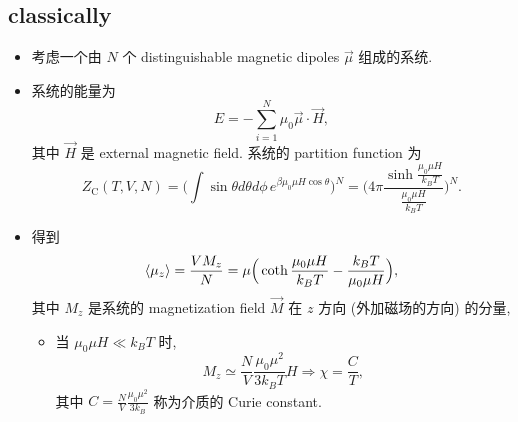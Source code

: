 \subsection{classically}
\begin{itemize}
	\item 考虑一个由 $N$ 个 distinguishable magnetic dipoles $\vec{\mu}$ 组成的系统.
	
	\item 系统的能量为
	\begin{equation}
		E = - \sum_{i = 1}^N \mu_0 \vec{\mu} \cdot \vec{H},
	\end{equation}
	其中 $\vec{H}$ 是 external magnetic field. 系统的 partition function 为
	\begin{equation}
		Z_\text{C}(T, V, N) = \Big( \int \sin \theta d\theta d\phi \, e^{\beta \mu_0 \mu H \cos \theta} \Big)^N = \Big( 4 \pi \frac{\sinh \frac{\mu_0 \mu H}{k_B T}}{\frac{\mu_0 \mu H}{k_B T}} \Big)^N.
	\end{equation}
	
	\item 得到
	\begin{equation}
		\braket{\mu_z} = \frac{V M_z}{N} = \mu \Big( \coth \frac{\mu_0 \mu H}{k_B T} - \frac{k_B T}{\mu_0 \mu H} \Big),
	\end{equation}
	其中 $M_z$ 是系统的 magnetization field $\vec{M}$ 在 $z$ 方向 (外加磁场的方向) 的分量,
	\begin{itemize}
		\item 当 $\mu_0 \mu H \ll k_B T$ 时,
		\begin{equation}
			M_z \simeq \frac{N}{V} \frac{\mu_0 \mu^2}{3 k_B T} H \Longrightarrow \chi = \frac{C}{T},
		\end{equation}
		其中 $C = \frac{N}{V} \frac{\mu_0 \mu^2}{3 k_B}$ 称为介质的 Curie constant.
	\end{itemize}
\end{itemize}


